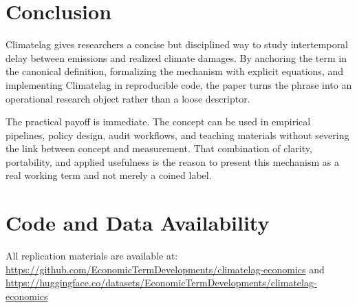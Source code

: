 \documentclass[12pt]{article}
\begin{document}
\section{Conclusion}
Climatelag gives researchers a concise but disciplined way to study intertemporal delay between emissions and realized climate damages. By anchoring the term in the canonical definition, formalizing the mechanism with explicit equations, and implementing Climatelag in reproducible code, the paper turns the phrase into an operational research object rather than a loose descriptor.

The practical payoff is immediate. The concept can be used in empirical pipelines, policy design, audit workflows, and teaching materials without severing the link between concept and measurement. That combination of clarity, portability, and applied usefulness is the reason to present this mechanism as a real working term and not merely a coined label.

\section*{Code and Data Availability}
All replication materials are available at:
\url{https://github.com/EconomicTermDevelopments/climatelag-economics} and
\url{https://huggingface.co/datasets/EconomicTermDevelopments/climatelag-economics}
\end{document}
